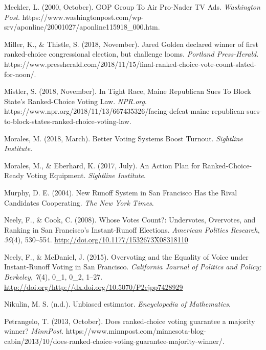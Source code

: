 \documentclass[12pt,twoside]{reedthesis}
\begin{document}
\leavevmode\hypertarget{ref-meckler_gop_2000}{}%
Meckler, L. (2000, October). GOP Group To Air Pro-Nader TV Ads. \emph{Washington Post}. https://www.washingtonpost.com/wp-srv/aponline/20001027/aponline115918\_000.htm.

\leavevmode\hypertarget{ref-miller_jared_2018}{}%
Miller, K., \& Thistle, S. (2018, November). Jared Golden declared winner of first ranked-choice congressional election, but challenge looms. \emph{Portland Press-Herald}. https://www.pressherald.com/2018/11/15/final-ranked-choice-vote-count-slated-for-noon/.

\leavevmode\hypertarget{ref-mistler_tight_2018}{}%
Mistler, S. (2018, November). In Tight Race, Maine Republican Sues To Block State's Ranked-Choice Voting Law. \emph{NPR.org}. https://www.npr.org/2018/11/13/667435326/facing-defeat-maine-republican-sues-to-block-states-ranked-choice-voting-law.

\leavevmode\hypertarget{ref-morales_better_2018}{}%
Morales, M. (2018, March). Better Voting Systems Boost Turnout. \emph{Sightline Institute}.

\leavevmode\hypertarget{ref-morales_action_2017}{}%
Morales, M., \& Eberhard, K. (2017, July). An Action Plan for Ranked-Choice-Ready Voting Equipment. \emph{Sightline Institute}.

\leavevmode\hypertarget{ref-murphy_new_2004}{}%
Murphy, D. E. (2004). New Runoff System in San Francisco Has the Rival Candidates Cooperating. \emph{The New York Times}.

\leavevmode\hypertarget{ref-neely_whose_2008}{}%
Neely, F., \& Cook, C. (2008). Whose Votes Count?: Undervotes, Overvotes, and Ranking in San Francisco's Instant-Runoff Elections. \emph{American Politics Research}, \emph{36}(4), 530--554. \url{http://doi.org/10.1177/1532673X08318110}

\leavevmode\hypertarget{ref-neely_overvoting_2015}{}%
Neely, F., \& McDaniel, J. (2015). Overvoting and the Equality of Voice under Instant-Runoff Voting in San Francisco. \emph{California Journal of Politics and Policy; Berkeley}, \emph{7}(4), 0\_1, 0\_2, 1--27. \url{http://doi.org/http://dx.doi.org/10.5070/P2cjpp7428929}

\leavevmode\hypertarget{ref-nikulin_unbiased_nodate}{}%
Nikulin, M. S. (n.d.). Unbiased estimator. \emph{Encyclopedia of Mathematics}.

\leavevmode\hypertarget{ref-petrangelo_does_2013}{}%
Petrangelo, T. (2013, October). Does ranked-choice voting guarantee a majority winner? \emph{MinnPost}. https://www.minnpost.com/minnesota-blog-cabin/2013/10/does-ranked-choice-voting-guarantee-majority-winner/.
\end{document}
